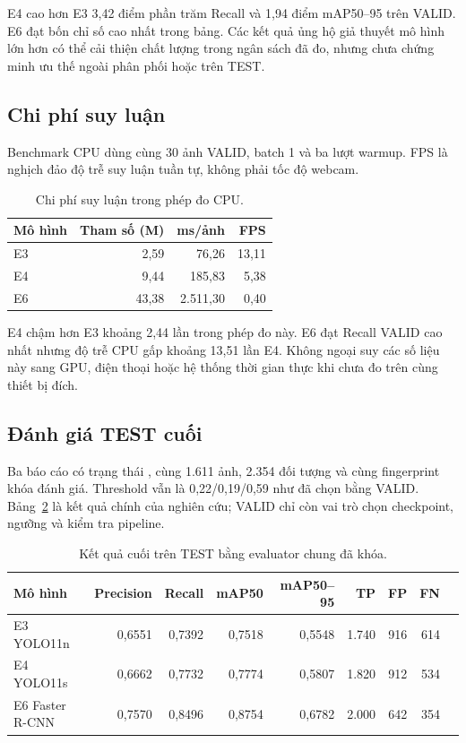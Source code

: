 \documentclass[10pt,a4paper,twocolumn]{article}
\begin{document}
E4 cao hơn E3 3,42 điểm phần trăm Recall và 1,94 điểm mAP50--95 trên VALID. E6 đạt bốn chỉ số cao nhất trong bảng. Các kết quả ủng hộ giả thuyết mô hình lớn hơn có thể cải thiện chất lượng trong ngân sách đã đo, nhưng chưa chứng minh ưu thế ngoài phân phối hoặc trên TEST.

\subsection{Chi phí suy luận}
Benchmark CPU dùng cùng 30 ảnh VALID, batch 1 và ba lượt warmup. FPS là nghịch đảo độ trễ suy luận tuần tự, không phải tốc độ webcam.
\begin{table}[ht]
\centering
\caption{Chi phí suy luận trong phép đo CPU.}\label{tab:latency}
\begin{tabular}{lrrr}\toprule
Mô hình & Tham số (M) & ms/ảnh & FPS\\\midrule
E3 & 2,59 & 76,26 & 13,11\\
E4 & 9,44 & 185,83 & 5,38\\
E6 & 43,38 & 2.511,30 & 0,40\\\bottomrule
\end{tabular}
\end{table}

E4 chậm hơn E3 khoảng 2,44 lần trong phép đo này. E6 đạt Recall VALID cao nhất nhưng độ trễ CPU gấp khoảng 13,51 lần E4. Không ngoại suy các số liệu này sang GPU, điện thoại hoặc hệ thống thời gian thực khi chưa đo trên cùng thiết bị đích.

\subsection{Đánh giá TEST cuối}
Ba báo cáo có trạng thái , cùng 1.611 ảnh, 2.354 đối tượng và cùng fingerprint khóa đánh giá. Threshold vẫn là 0,22/0,19/0,59 như đã chọn bằng VALID. Bảng~\ref{tab:test} là kết quả chính của nghiên cứu; VALID chỉ còn vai trò chọn checkpoint, ngưỡng và kiểm tra pipeline.

\begin{table}[ht]
\centering
\caption{Kết quả cuối trên TEST bằng evaluator chung đã khóa.}\label{tab:test}
\begin{tabular}{lrrrrrrrr}\toprule
Mô hình & Precision & Recall & mAP50 & mAP50--95 & TP & FP & FN\\\midrule
E3 YOLO11n & 0,6551 & 0,7392 & 0,7518 & 0,5548 & 1.740 & 916 & 614\\
E4 YOLO11s & 0,6662 & 0,7732 & 0,7774 & 0,5807 & 1.820 & 912 & 534\\
E6 Faster R-CNN & 0,7570 & 0,8496 & 0,8754 & 0,6782 & 2.000 & 642 & 354\\\bottomrule
\end{tabular}
\end{table}
\end{document}
